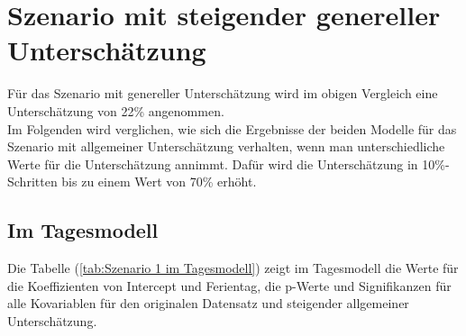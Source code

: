 \documentclass[12pt]{scrreprt}
\begin{document}
\section{Szenario mit steigender genereller Unterschätzung}
Für das Szenario mit genereller Unterschätzung wird im obigen Vergleich eine Unterschätzung von 22\% angenommen. \\
Im Folgenden wird verglichen, wie sich die Ergebnisse der beiden Modelle für das Szenario mit allgemeiner Unterschätzung verhalten, wenn man unterschiedliche Werte für die Unterschätzung annimmt. Dafür wird die Unterschätzung in 10\%-Schritten bis zu einem Wert von 70\% erhöht.

\subsection{Im Tagesmodell}
Die Tabelle (\ref{tab:Szenario 1 im Tagesmodell}) zeigt im Tagesmodell die Werte für die Koeffizienten von Intercept und Ferientag, die p-Werte und Signifikanzen für alle Kovariablen für den originalen Datensatz und steigender allgemeiner Unterschätzung. 
\end{document}
